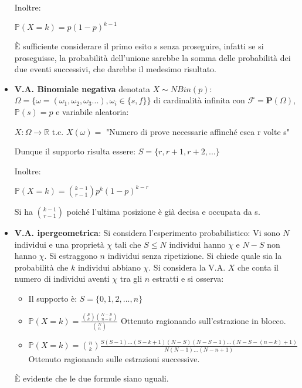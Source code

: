 \begin{itemize}
   Inoltre:
   \begin{center}
       $\mathbb{P}(X=k)=p(1-p)^{k-1}$
   \end{center}
   È sufficiente considerare il primo esito s senza proseguire, infatti se si proseguisse, la probabilità dell'unione sarebbe la somma delle probabilità dei due eventi successivi, che darebbe il medesimo risultato.
   
    \vspace{10px}
    \item \textbf{V.A. Binomiale negativa} denotata $X\sim NBin(p)$:
    \vspace{5px}
    \newline
    $\Omega=\{\omega=(\omega_1,\omega_2,\omega_3...) , \omega_i\in\{s,f\}\}$ di cardinalità infinita con
    \newline
    $\mathscr{F}=\mathbf{P}(\Omega)$, $\mathbb{P}(s)=p$ e variabile aleatoria:
    \begin{center}
        $X:\Omega\longrightarrow\mathbb{R}$ t.c. $X(\omega)=$
        "Numero di prove necessarie affinché esca r volte s"
    \end{center}
    Dunque il supporto risulta essere: $S=\{r,r+1,r+2,...\}$
    
   Inoltre:
   \begin{center}
       $\mathbb{P}(X=k)=\binom{k-1}{r-1}p^k(1-p)^{k-r}$
   \end{center}
   Si ha $\binom{k-1}{r-1}$ poiché l'ultima posizione è già decisa e occupata da s.
   
   \vspace{10px}
   \item \textbf{V.A. ipergeometrica}:
   \vspace{5px}
   \newline
   \noindent
   Si considera l'esperimento probabilistico: Vi sono $N$ individui e una proprietà $\chi$ tali che $S\leq N$ individui hanno $\chi$ e $N-S$ non hanno $\chi$. Si estraggono $n$ individui senza ripetizione. Si chiede quale sia la probabilità che $k$ individui abbiano $\chi$.
   \vspace{5px}
   \newline
   \noindent
   Si considera la V.A. $X$ che conta il numero di individui aventi $\chi$ tra gli $n$ estratti e si osserva:
   \begin{itemize}
       \item Il supporto è: $S=\{0,1,2,...,n\}$
       \item $\mathbb{P}(X=k)=${\Large$\frac{\binom{S}{k}\binom{N-S}{n-k}}{\binom{N}{n}}$}
       Ottenuto ragionando sull'estrazione in blocco.
       \item $\mathbb{P}(X=k)=\binom{n}{k}\frac{S(S-1)...(S-k+1)(N-S)(N-S-1)...(N-S-(n-k)+1)}{N(N-1)...(N-n+1)}$ Ottenuto ragionando sulle estrazioni successive.
   \end{itemize}
   È evidente che le due formule siano uguali.
   

\end{itemize}
